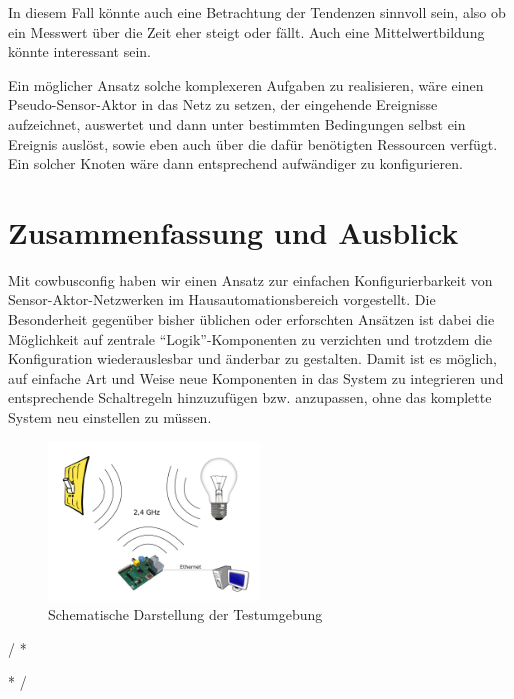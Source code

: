 \documentclass{IEEEtran}
\begin{document}
    In diesem Fall könnte auch eine Betrachtung der Tendenzen sinnvoll sein,
    also ob ein Messwert über die Zeit eher steigt oder fällt.
    Auch eine Mittelwertbildung könnte interessant sein.

    Ein möglicher Ansatz solche komplexeren Aufgaben zu realisieren,
    wäre einen Pseudo-Sensor-Aktor in das Netz zu setzen, der eingehende
    Ereignisse aufzeichnet, auswertet und dann unter bestimmten Bedingungen
    selbst ein Ereignis auslöst, sowie eben auch über die dafür benötigten
    Ressourcen verfügt. Ein solcher Knoten wäre dann entsprechend
    aufwändiger zu konfigurieren.


\section{Zusammenfassung und Ausblick}
    Mit cowbusconfig haben wir einen Ansatz zur einfachen Konfigurierbarkeit
    von Sensor-Aktor-Netzwerken im Hausautomationsbereich vorgestellt.
    Die Besonderheit gegenüber bisher üblichen oder erforschten Ansätzen ist
    dabei die Möglichkeit auf zentrale \enquote{Logik}-Komponenten
    zu verzichten und trotzdem die Konfiguration wiederauslesbar und
    änderbar zu gestalten.
    Damit ist es möglich, auf einfache Art und Weise neue Komponenten in das
    System zu integrieren und entsprechende Schaltregeln hinzuzufügen bzw.
    anzupassen, ohne das komplette System neu einstellen zu müssen.


        \begin{figure}
            \centering
            \includegraphics[width=0.5\textwidth]{img/system}
            \caption{Schematische Darstellung der Testumgebung}
            \label{fig:comp}
        \end{figure}


\renewcommand{\IEEEiedlistdecl}{\IEEEsetlabelwidth{CSMA/CA}}
\begin{acronym}
\end{acronym}
\renewcommand{\IEEEiedlistdecl}{\relax}%

\comment / *
\listoffigures
\clearpage

\listoftables
\clearpage
* /




\end{document}
